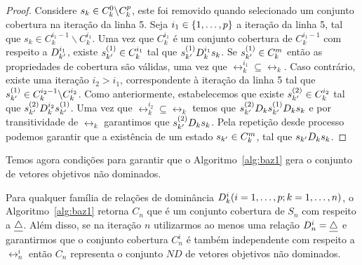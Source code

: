 \begin{proof}
Considere $s_k \in C_k^0\backslash C_k^p$, este foi removido quando
selecionado um conjunto cobertura na iteração da linha 5.
Seja $i_1 \in \{1, \ldots, p \}$ a iteração da linha 5, tal que
$s_k \in C_k^{i_1 - 1}\backslash C_k^{i_1}$.
Uma vez que $C_k^{i_1}$ é um conjunto cobertura de $C_k^{i_1-1}$ com respeito
a $D^{i_1}_{{k'}}$, existe $s_{{k'}}^{(1)} \in C_k^{i_1}$ tal que $ s_{{k'}}^{(1)} D_k^{i_1} {s_k}$.
Se $s_{{k'}}^{(1)} \in C_k^m$ então as propriedades de cobertura são válidas,
uma vez que $\rel_k^{i_1} \subseteq \rel_k$.
Caso contrário, existe uma iteração $i_2 > i_1$, correspondente à iteração
da linha 5 tal que $s_{{k'}}^{(1)} \in C_k^{i_2-1}\backslash C_k^{i_2}$.
Como anteriormente, estabelecemos que existe  $s_{{k'}}^{(2)} \in C_k^{i_2}$
tal que $s_{{k'}}^{(2)} D_k^{i_2} s_{{k'}}^{(1)}$.
Uma vez que $\rel_k^{i_2} \subseteq \rel_k$ temos que
$s_{{k'}}^{(2)} D_k s_{{k'}}^{(1)} D_k s_k$ e por transitividade de $\rel_k$
garantimos que $s_{{k'}}^{(2)} D_k s_k$.
Pela repetição desde processo podemos garantir que a existência de um estado
$s_{{k'}} \in C_k^m$, tal que $s_{{k'}} D_k s_k$.
\qedhere
\end{proof}

Temos agora condições para garantir que o Algoritmo~\ref{alg:baz1} gera o conjunto de
vetores objetivos não dominados.

\begin{myteo}
  Para qualquer família de relações de dominância
  $D_k^i (i = 1, \ldots, p; k = 1, \ldots, n)$,
  o Algoritmo~\ref{alg:baz1} retorna $C_n$ que é um conjunto cobertura de $S_n$
  com respeito a $\underline{\triangle}$.
  Além disso, se na iteração $n$ utilizarmos ao menos uma relação
  $D_n^i = \underline{\triangle}$ e garantirmos que o conjunto cobertura $C_n^i$
  é também independente com respeito a $\rel_n^i$ então $C_n$ representa
  o conjunto $ND$ de vetores objetivos não dominados.
\end{myteo}

